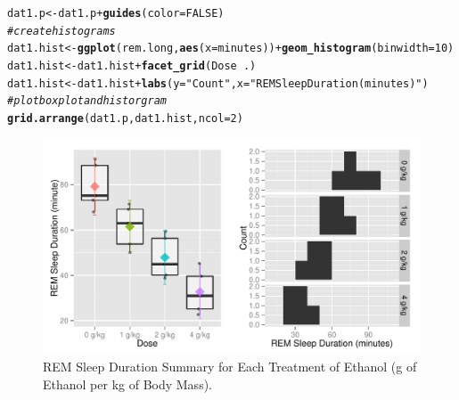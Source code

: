 \documentclass{article}\usepackage[]{graphicx}\usepackage[]{color}
\makeatletter
\def\maxwidth{ %
  \ifdim\Gin@nat@width>\linewidth
    \linewidth
  \else
    \Gin@nat@width
  \fi
}
\newcommand{\hlnum}[1]{\textcolor[rgb]{0.686,0.059,0.569}{#1}}%
\newcommand{\hlstr}[1]{\textcolor[rgb]{0.192,0.494,0.8}{#1}}%
\newcommand{\hlcom}[1]{\textcolor[rgb]{0.678,0.584,0.686}{\textit{#1}}}%
\newcommand{\hlopt}[1]{\textcolor[rgb]{0,0,0}{#1}}%
\newcommand{\hlstd}[1]{\textcolor[rgb]{0.345,0.345,0.345}{#1}}%
\newcommand{\hlkwb}[1]{\textcolor[rgb]{0.69,0.353,0.396}{#1}}%
\newcommand{\hlkwc}[1]{\textcolor[rgb]{0.333,0.667,0.333}{#1}}%
\newcommand{\hlkwd}[1]{\textcolor[rgb]{0.737,0.353,0.396}{\textbf{#1}}}%
\newenvironment{kframe}{%
 \def\at@end@of@kframe{}%
 \ifinner\ifhmode%
  \def\at@end@of@kframe{\end{minipage}}%
  \begin{minipage}{\columnwidth}%
 \fi\fi%
 \def\FrameCommand##1{\hskip\@totalleftmargin \hskip-\fboxsep
 \colorbox{shadecolor}{##1}\hskip-\fboxsep
     \hskip-\linewidth \hskip-\@totalleftmargin \hskip\columnwidth}%
 \MakeFramed {\advance\hsize-\width
   \@totalleftmargin\z@ \linewidth\hsize
   \@setminipage}}%
 {\par\unskip\endMakeFramed%
 \at@end@of@kframe}
\newenvironment{knitrout}{}{} %
\makeatother
\begin{document}
\begin{knitrout}
\begin{kframe}
\begin{alltt}
\hlstd{dat1.p} \hlkwb{<-} \hlstd{dat1.p} \hlopt{+} \hlkwd{guides}\hlstd{(}\hlkwc{color} \hlstd{=} \hlnum{FALSE}\hlstd{)}
\hlcom{# create histograms}
\hlstd{dat1.hist} \hlkwb{<-} \hlkwd{ggplot}\hlstd{(rem.long,} \hlkwd{aes}\hlstd{(}\hlkwc{x} \hlstd{= minutes))} \hlopt{+} \hlkwd{geom_histogram}\hlstd{(}\hlkwc{binwidth} \hlstd{=} \hlnum{10}\hlstd{)}
\hlstd{dat1.hist} \hlkwb{<-} \hlstd{dat1.hist} \hlopt{+} \hlkwd{facet_grid}\hlstd{(Dose} \hlopt{~} \hlstd{.)}
\hlstd{dat1.hist} \hlkwb{<-} \hlstd{dat1.hist}\hlopt{+} \hlkwd{labs}\hlstd{(}\hlkwc{y} \hlstd{=} \hlstr{"Count"}\hlstd{,} \hlkwc{x} \hlstd{=} \hlstr{"REM Sleep Duration (minutes)"}\hlstd{)}
\hlcom{# plot boxplot and historgram}
\hlkwd{grid.arrange}\hlstd{(dat1.p, dat1.hist,} \hlkwc{ncol} \hlstd{=} \hlnum{2}\hlstd{)}
\end{alltt}
\end{kframe}\begin{figure}[]


{\centering \includegraphics[width=\maxwidth]{figure/a_BoxPlot-1} 

}

\caption[REM Sleep Duration Summary for Each Treatment of Ethanol (g of Ethanol per kg of Body Mass)]{REM Sleep Duration Summary for Each Treatment of Ethanol (g of Ethanol per kg of Body Mass).\label{fig:a_BoxPlot}}
\end{figure}


\end{knitrout}
\end{document}
